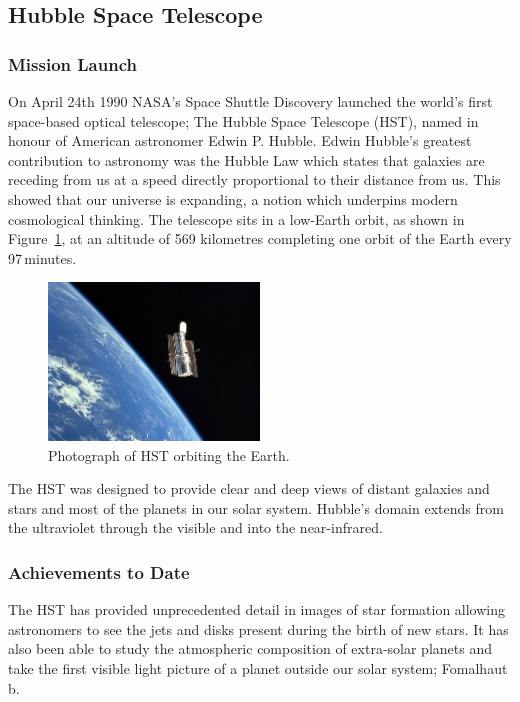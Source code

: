 
\subsection{Hubble Space Telescope} %
\label{sub:hubble_space_telescope}

	\subsubsection{Mission Launch} %
	\label{ssub:mission_launch}
		On April 24th 1990 NASA's Space Shuttle Discovery launched the world's first space-based optical telescope; The Hubble Space Telescope (HST), named in honour of American astronomer Edwin P. Hubble. Edwin Hubble's greatest contribution to astronomy was the Hubble Law which states that galaxies are receding from us at a speed directly proportional to their distance from us. This showed that our universe is expanding, a notion which underpins modern cosmological thinking. The telescope sits in a low-Earth orbit, as shown in Figure~\ref{fig:hubble_space_telescope}, at an altitude of 569 kilometres completing one orbit of the Earth every 97\,minutes\cite{Hubsite_1}.
		\begin{figure}[!htbp]
			\centering
			\includegraphics[width=0.5\textwidth]{../Images/Hubble_Space_Telescope.jpg}
			\caption{Photograph of HST orbiting the Earth.\label{fig:hubble_space_telescope}}
		\end{figure}

		The HST was designed to provide clear and deep views of distant galaxies and stars and most of the planets in our solar system. Hubble's domain extends from the ultraviolet through the visible and into the near-infrared\cite{NASA_1}.

	\subsubsection{Achievements to Date} %
	\label{ssub:achievements_to_date}
		The HST has provided unprecedented detail in images of star formation allowing astronomers to see the jets and disks present during the birth of new stars. It has also been able to study the atmospheric composition of extra-solar planets and take the first visible light picture of a planet outside our solar system; Fomalhaut b\cite{Hubsite_3}.

